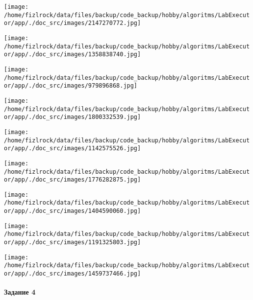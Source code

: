 \documentclass[a4paper, 12pt]{article}
\begin{document}
\texttt{[image: /home/fizlrock/data/files/backup/code\_backup/hobby/algoritms/LabExecutor/app/./doc\_src/images/2147270772.jpg]}

\texttt{[image: /home/fizlrock/data/files/backup/code\_backup/hobby/algoritms/LabExecutor/app/./doc\_src/images/1358838740.jpg]}

\texttt{[image: /home/fizlrock/data/files/backup/code\_backup/hobby/algoritms/LabExecutor/app/./doc\_src/images/979896868.jpg]}

\texttt{[image: /home/fizlrock/data/files/backup/code\_backup/hobby/algoritms/LabExecutor/app/./doc\_src/images/1800332539.jpg]}

\texttt{[image: /home/fizlrock/data/files/backup/code\_backup/hobby/algoritms/LabExecutor/app/./doc\_src/images/1142575526.jpg]}

\texttt{[image: /home/fizlrock/data/files/backup/code\_backup/hobby/algoritms/LabExecutor/app/./doc\_src/images/1776282875.jpg]}

\texttt{[image: /home/fizlrock/data/files/backup/code\_backup/hobby/algoritms/LabExecutor/app/./doc\_src/images/1404590060.jpg]}

\texttt{[image: /home/fizlrock/data/files/backup/code\_backup/hobby/algoritms/LabExecutor/app/./doc\_src/images/1191325803.jpg]}

\texttt{[image: /home/fizlrock/data/files/backup/code\_backup/hobby/algoritms/LabExecutor/app/./doc\_src/images/1459737466.jpg]}
\pagebreak
\paragraph{Задание 4}
\end{document}
